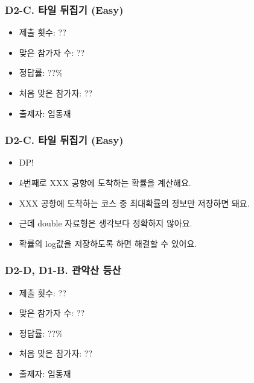 \documentclass[xetex]{beamer}
\begin{document}
\begin{frame}
  \frametitle{D2-C. 타일 뒤집기 (Easy)}
  \begin{itemize}
    \item 제출 횟수: ??
    \item 맞은 참가자 수: ??
    \item 정답률: ??\%
    \item 처음 맞은 참가자: ??
    \item 출제자: 임동재
  \end{itemize}
\end{frame}

\begin{frame}
  \frametitle{D2-C. 타일 뒤집기 (Easy)}
  \begin{itemize}
    \item DP!
    \item $k$번째로 XXX 공항에 도착하는 확률을 계산해요.
    \item XXX 공항에 도착하는 코스 중 최대확률의 정보만 저장하면 돼요.
    \item 근데 double 자료형은 생각보다 정확하지 않아요.
    \item 확률의 log값을 저장하도록 하면 해결할 수 있어요.
  \end{itemize}
\end{frame}

\begin{frame}
  \frametitle{D2-D, D1-B. 관악산 등산}
  \begin{itemize}
    \item 제출 횟수: ??
    \item 맞은 참가자 수: ??
    \item 정답률: ??\%
    \item 처음 맞은 참가자: ??
    \item 출제자: 임동재
  \end{itemize}
\end{frame}
\end{document}
